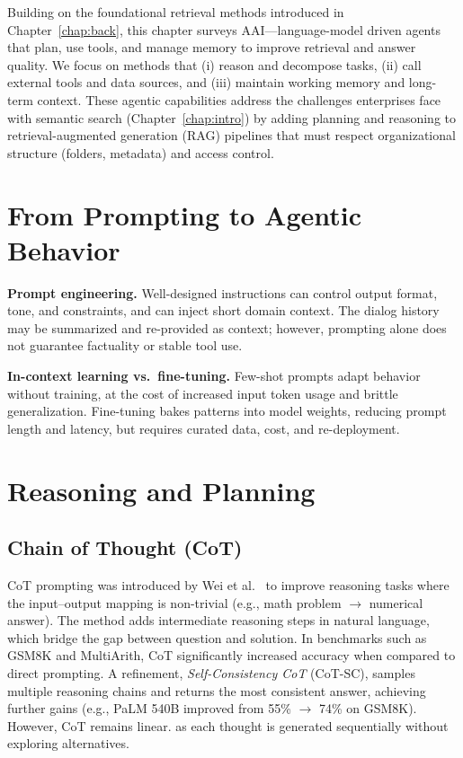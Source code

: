 \label{chap:stateofart}
\cleardoublepage

Building on the foundational retrieval methods introduced in Chapter~\ref{chap:back}, this chapter surveys \gls{AAI}—language-model driven agents that plan, use tools, and manage memory to improve retrieval and answer quality. We focus on methods that (i) reason and decompose tasks, (ii) call external tools and data sources, and (iii) maintain working memory and long-term context. These agentic capabilities address the challenges enterprises face with semantic search (Chapter~\ref{chap:intro}) by adding planning and reasoning to retrieval-augmented generation (\gls{RAG}) pipelines that must respect organizational structure (folders, metadata) and access control.

\section{From Prompting to Agentic Behavior}
\textbf{Prompt engineering.} Well-designed instructions can control output format, tone, and constraints, and can inject short domain context.  The dialog history may be summarized and re-provided as context; however, prompting alone does not guarantee factuality or stable tool use.

\textbf{In-context learning vs.\ fine-tuning.} Few-shot prompts adapt behavior without training, at the cost of increased input token usage and brittle generalization. Fine-tuning bakes patterns into model weights, reducing prompt length and latency, but requires curated data, cost, and re-deployment.

\section{Reasoning and Planning}
\subsection{Chain of Thought (CoT)}
CoT prompting was introduced by Wei et al.~\cite{chainofthought} to improve reasoning tasks where the input–output mapping is non-trivial (e.g., math problem $\to$ numerical answer). The method adds intermediate reasoning steps in natural language, which bridge the gap between question and solution.
In benchmarks such as GSM8K and MultiArith, CoT significantly increased accuracy when compared to direct prompting. A refinement, \emph{Self-Consistency CoT} (CoT-SC), samples multiple reasoning chains and returns the most consistent answer, achieving further gains (e.g., PaLM 540B improved from 55\% $\to$ 74\% on GSM8K). However, CoT remains linear. as each thought is generated sequentially without exploring alternatives.

